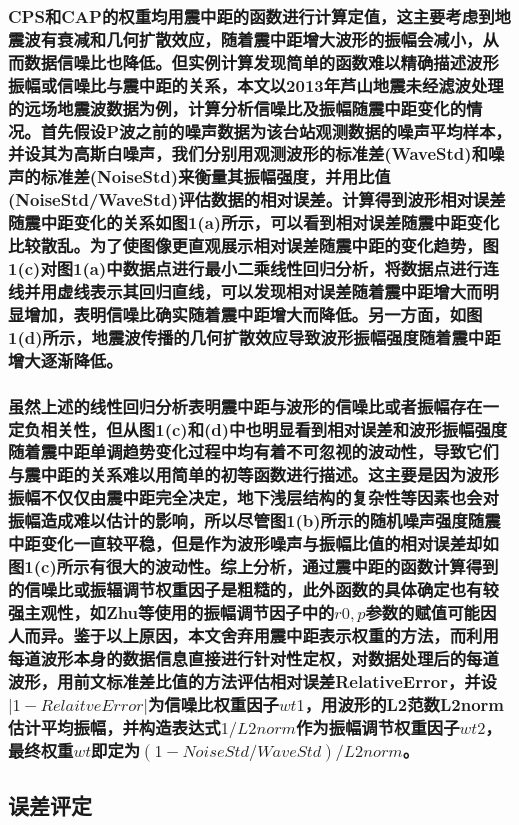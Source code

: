 \documentclass[a4paper,12pt,single,pdftex]{scrartcl}
\begin{document}
\label{ID_710694523}\subsubsection{CPS和CAP的权重均用震中距的函数进行计算定值，这主要考虑到地震波有衰减和几何扩散效应，随着震中距增大波形的振幅会减小，从而数据信噪比也降低。但实例计算发现简单的函数难以精确描述波形振幅或信噪比与震中距的关系，本文以2013年芦山地震未经滤波处理的远场地震波数据为例，计算分析信噪比及振幅随震中距变化的情况。首先假设P波之前的噪声数据为该台站观测数据的噪声平均样本，并设其为高斯白噪声，我们分别用观测波形的标准差(WaveStd)和噪声的标准差(NoiseStd)来衡量其振幅强度，并用比值(NoiseStd/WaveStd)评估数据的相对误差。计算得到波形相对误差随震中距变化的关系如图1(a)所示，可以看到相对误差随震中距变化比较散乱。为了使图像更直观展示相对误差随震中距的变化趋势，图1(c)对图1(a)中数据点进行最小二乘线性回归分析，将数据点进行连线并用虚线表示其回归直线，可以发现相对误差随着震中距增大而明显增加，表明信噪比确实随着震中距增大而降低。另一方面，如图1(d)所示，地震波传播的几何扩散效应导致波形振幅强度随着震中距增大逐渐降低。}

\label{ID_562982942}\subsubsection{虽然上述的线性回归分析表明震中距与波形的信噪比或者振幅存在一定负相关性，但从图1(c)和(d)中也明显看到相对误差和波形振幅强度随着震中距单调趋势变化过程中均有着不可忽视的波动性，导致它们与震中距的关系难以用简单的初等函数进行描述。这主要是因为波形振幅不仅仅由震中距完全决定，地下浅层结构的复杂性等因素也会对振幅造成难以估计的影响，所以尽管图1(b)所示的随机噪声强度随震中距变化一直较平稳，但是作为波形噪声与振幅比值的相对误差却如图1(c)所示有很大的波动性。综上分析，通过震中距的函数计算得到的信噪比或振辐调节权重因子是粗糙的，此外函数的具体确定也有较强主观性，如Zhu等使用的振幅调节因子中的$r0,p$参数的赋值可能因人而异。鉴于以上原因，本文舍弃用震中距表示权重的方法，而利用每道波形本身的数据信息直接进行针对性定权，对数据处理后的每道波形，用前文标准差比值的方法评估相对误差RelativeError，并设$|1-RelaitveError|$为信噪比权重因子$wt1$，用波形的L2范数L2norm估计平均振幅，并构造表达式$1/L2norm$作为振幅调节权重因子$wt2$，最终权重$wt$即定为$(1-NoiseStd/WaveStd)/L2norm$。}

\label{ID_1192414214}\subsection{误差评定}
\end{document}
